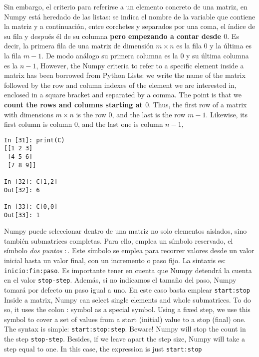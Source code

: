 \begin{paracol}{2}
Sin embargo,  el criterio para referirse a un elemento concreto de una matriz, en Numpy está heredado de las listas: se indica el nombre de la variable que contiene la matriz y a continuación, entre corchetes y separados por una coma, el índice de su fila y después él de su columna \textbf{pero empezando a contar desde $0$}. Es decir, la primera fila de una matriz de dimensión $m\times n$ es la fila $0$ y la última es la fila $m-1$. De modo análogo su primera columna es la $0$ y su última columna es la $n-1$,
\switchcolumn
However, the Numpy criteria to refer to a specific element inside a matrix has been borrowed from Python Lists: we write the name of the matrix followed by the row and column indexes of the element we are interested in, enclosed in a square bracket and separated by a comma. The point is that we \textbf{count the rows and columns starting at $0$}. Thus, the first row of a matrix with dimensions $m\times n$ is the row $0$, and the last is the row $m-1$. Likewise, its first column is column $0$, and the last one is column $n-1$, 
\end{paracol}
\begin{center}
    \begin{minipage}{0.3\textwidth}
        \begin{verbatim}
In [31]: print(C)
[[1 2 3]
 [4 5 6]
 [7 8 9]]

In [32]: C[1,2]
Out[32]: 6

In [33]: C[0,0]
Out[33]: 1
        \end{verbatim}
    \end{minipage}
\end{center}

\begin{paracol}{2}
Numpy puede seleccionar dentro de una matriz no solo elementos aislados, sino también submatrices completas. 
Para ello, emplea un símbolo reservado, el símbolo \emph{dos puntos} $:$. Este símbolo se emplea para recorrer valores desde un valor inicial hasta un valor final, con un incremento o paso fijo. La sintaxis es: \texttt{inicio:fin:paso}. Es importante tener en cuenta que Numpy detendrá la cuenta en el valor \texttt{stop-step}. Además, si no indicamos el tamaño del paso, Numpy tomará por defecto un paso igual a uno. En este caso basta emplear \texttt{start:stop}
\switchcolumn
Inside a matrix, Numpy can select single elements and whole submatrices. To do so, it uses the colon : symbol as a special symbol. Using a fixed step, we use this symbol to cover a set of values from a start (initial) value to a stop (final) one. The syntax is simple: \texttt{start:stop:step}. Beware! Numpy will stop the count in the step \texttt{stop-step}. Besides, if we leave apart the step size, Numpy will take a step equal to one. In this case, the expression is just \texttt{start:stop}
\end{paracol}

